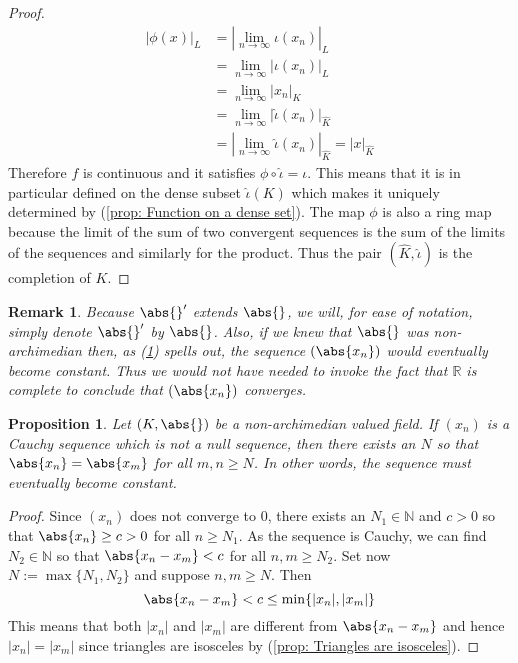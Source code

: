 \documentclass{article}
\newtheorem{proposition}{Proposition}[section]
\newtheorem{remark}{Remark}[section]
\newcommand{\mbb}[1]{\mathbb{#1}}
\begin{document}
\begin{proof}
    \begin{align*}
        |\phi(x)|_{L} &= |\lim_{n \to \infty} \iota(x_n)|_{L} \\
        &= \lim_{n \to \infty} |\iota(x_n)|_{L} \\ 
        &= \lim_{n \to \infty} |x_n|_{K} \\
        &= \lim_{n \to \infty} |\hat \iota(x_n)|_{\hat K} \\
        &= |\lim_{n \to \infty} \hat \iota(x_n)|_{\hat K} = |x|_{\hat K}
    \end{align*}
    Therefore $f$ is continuous and it satisfies $\phi \circ \hat \iota = \iota$. This means that it is in particular defined on the dense subset $\hat \iota(K)$ which makes it uniquely determined by (\ref{prop: Function on a dense set}). The map $\phi$ is also a ring map because the limit of the sum of two convergent sequences is the sum of the limits of the sequences and similarly for the product. Thus the pair $(\hat K, \hat \iota)$ is the completion of $K$. 
\end{proof}
\begin{remark}
    Because $\abs{}'$ extends $\abs{}$, we will, for ease of notation, simply denote $\abs{}'$ by $\abs{}$. Also, if we knew that $\abs{}$ was non-archimedian then, as (\ref{prop: Non-archimedian absolute value has constant tail}) spells out, the sequence $(\abs{x_n})$ would eventually become constant. Thus we would not have needed to invoke the fact that $\mbb R$ is complete to conclude that $(\abs{x_n})$ converges.
\end{remark}



 


\begin{proposition}\label{prop: Non-archimedian absolute value has constant tail}
    Let $(K, \abs{})$ be a non-archimedian valued field. If $(x_n)$ is a Cauchy sequence which is not a null sequence, then there exists an $N$ so that $\abs{x_n} = \abs{x_m}$ for all $m,n \geq N$. In other words, the sequence must eventually become constant.
\end{proposition}
\begin{proof}
    Since $(x_n)$ does not converge to 0, there exists an $N_1 \in \mbb N$ and $c > 0$ so that $\abs{x_n} \geq c > 0$ for all $n \geq N_1$. As the sequence is Cauchy, we can find $N_2 \in \mbb N$ so that $\abs{x_n - x_m} < c$ for all $n,m \geq N_2$. Set now $N := \max \{N_1, N_2\}$ and suppose $n,m \geq N$. Then 
    $$\abs{x_n - x_m} <  c \leq \min\{|x_n|, |x_m|\}$$
    This means that both $|x_n|$ and $|x_m|$ are different from $\abs{x_n - x_m}$ and hence $|x_n| = |x_m|$ since triangles are isosceles by (\ref{prop: Triangles are isosceles}). 
\end{proof}
\end{document}
